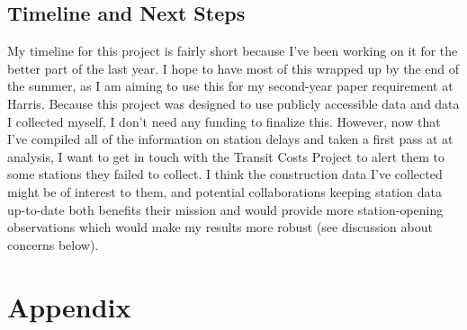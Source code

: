 \documentclass[12pt]{article}
\begin{document}
\subsection{Timeline and Next Steps}\label{subsec:nextsteps}
My timeline for this project is fairly short because I've been working on it for the better part of the last year. I hope to have most of this wrapped up by the end of the summer, as I am aiming to use this for my second-year paper requirement at Harris. Because this project was designed to use publicly accessible data and data I collected myself, I don't need any funding to finalize this. However, now that I've compiled all of the information on station delays and taken a first pass at at analysis, I want to get in touch with the Transit Costs Project to alert them to some stations they failed to collect. I think the construction data I've collected might be of interest to them, and potential collaborations keeping station data up-to-date both benefits their mission and would provide more station-opening observations which would make my results more robust (see discussion about concerns below). 

\newpage
\printbibliography
\newpage
\section*{Appendix}\label{sec:appendix}
\end{document}
